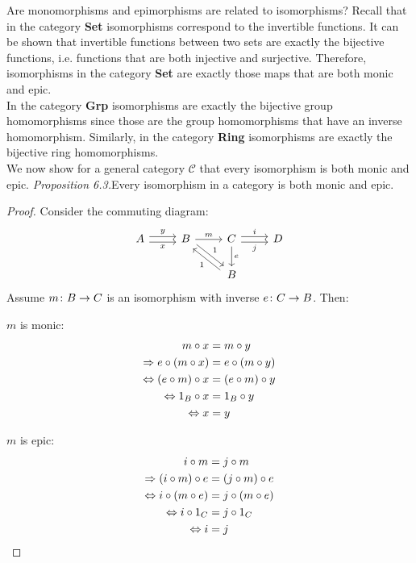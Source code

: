 Are monomorphisms and epimorphisms are related to isomorphisms?
Recall that in the category \textbf{Set} isomorphisms correspond to the invertible functions.
It can be shown that invertible functions between two sets are
exactly the bijective functions, i.e. functions that are both injective and surjective.
Therefore, isomorphisms in the category \textbf{Set} are exactly those maps that are both monic and epic.\\
In the category \textbf{Grp} isomorphisms are exactly the bijective group homomorphisms
since those are the group homomorphisms that have an inverse homomorphism.
Similarly, in the category \textbf{Ring} isomorphisms are exactly the bijective ring homomorphisms.\\
We now show for a general category $\mathscr{C}$ that every isomorphism is both monic and epic.
\textit{Proposition 6.3.}Every isomorphism in a category is both monic and epic.
\begin{proof}
  Consider the commuting diagram:
  \[
    \begin{tikzcd}
      A \arrow[r,shift left, "y"] \arrow[r,shift right,swap,"x"] &
      B \arrow[dr, shift left, "1"]  \arrow{r}{m}  &
      C \arrow{d}{e} \arrow[r,shift left, "i"] \arrow[r,shift right,swap,"j"] & D\\
      &  & B \arrow[ul, shift left, "1"]&
    \end{tikzcd}
  \]
  Assume $m \from B \to C$ is an isomorphism with inverse $e \from C \to B$.
  Then:\\
  \begin{minipage}{.5\linewidth}
    \vspace{4mm}
    \centering $m$ is monic:
    \[
      \begin{aligned}
        m \mathbin{\circ} x &= m \mathbin{\circ} y\\
        \Rightarrow e \mathbin{\circ} (m \mathbin{\circ} x) &= e \mathbin{\circ} (m \mathbin{\circ} y)\\
        \Leftrightarrow (e \mathbin{\circ} m) \mathbin{\circ} x &= (e \mathbin{\circ} m) \mathbin{\circ} y\\
        \Leftrightarrow 1_B \mathbin{\circ} x &= 1_B \mathbin{\circ} y\\
        \Leftrightarrow x &= y
      \end{aligned}
    \]
  \end{minipage}%
  \begin{minipage}{.5\linewidth}
    \vspace{4mm}
    \centering $m$ is epic:
    \[
      \begin{aligned}
        i \mathbin{\circ} m &= j \mathbin{\circ} m \\
        \Rightarrow (i \mathbin{\circ} m) \mathbin{\circ} e &= (j \mathbin{\circ} m) \mathbin{\circ} e\\
        \Leftrightarrow i \mathbin{\circ} (m \mathbin{\circ} e) &= j \mathbin{\circ} (m \mathbin{\circ} e)\\
        \Leftrightarrow i \mathbin{\circ} 1_C &= j \mathbin{\circ} 1_C\\
        \Leftrightarrow i &= j
      \end{aligned}
    \]
  \end{minipage}%
\end{proof}
